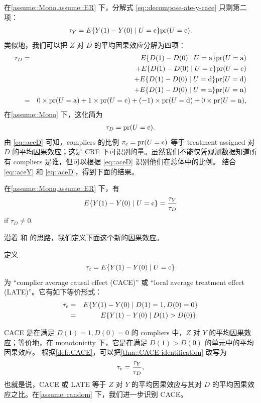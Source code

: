 在\cref{assume::Mono,assume::ER} 下，分解式 \cref{eq::decompose-ate-y-cace} 只剩第二项：
\begin{eqnarray}
\label{eq::aceY}
\tau_Y  = E\{ Y(1) - Y(0) \mid U=\textup{c}   \} \textup{pr}(U = \textup{c} ).
\end{eqnarray}
类似地，我们可以把 $Z$ 对 $D$ 的平均因果效应分解为四项：
\begin{eqnarray*}
\tau_D &=& E\{ D(1) - D(0) \mid U=\textup{a}  \} \textup{pr}(U = \textup{a} ) \\
&&+ E\{ D(1) - D(0) \mid U=\textup{c}   \} \textup{pr}(U = \textup{c} ) \\
&&+ E\{ D(1) - D(0) \mid U=\textup{d}  \} \textup{pr}(U = \textup{d} ) \\
&&+ E\{ D(1) - D(0) \mid U=\textup{n}  \} \textup{pr}(U = \textup{n} )  \\
&=& 0\times \textup{pr}(U = \textup{a} ) 
+ 1 \times \textup{pr}(U = \textup{c} ) 
+ (-1)\times   \textup{pr}(U = \textup{d} )
+ 0 \times  \textup{pr}(U = \textup{n} ) ,
\end{eqnarray*}
在\cref{assume::Mono} 下，这化简为
\begin{eqnarray}
\label{eq::aceD}
\tau_D  = \textup{pr}(U = \textup{c} ) .
\end{eqnarray}
由 \cref{eq::aceD} 可知，compliers 的比例 $\pi_{\textup{c}} = \textup{pr}(U = \textup{c})$ 等于 treatment assigned 对 $D$ 的平均因果效应；这是 CRE 下可识别的量。虽然我们不能仅凭观测数据知道所有 compliers 是谁，但可以根据 \cref{eq::aceD} 识别他们在总体中的比例。
结合 \cref{eq::aceY} 和 \cref{eq::aceD}，得到下面的结果。


\begin{theorem}
\label{thm::CACE-identification}
在\cref{assume::Mono,assume::ER} 下，有
$$
E\{ Y(1) - Y(0) \mid U=\textup{c}   \} = \frac{ \tau_Y  }{ \tau_D}
$$
if $\tau_D \neq 0$. 
\end{theorem}


 

沿着 \citet{imbens1994identification} 和 \citet{angrist1996identification} 的思路，我们定义下面这个新的因果效应。

\begin{definition}\label{def::CACE}
定义
$$
\tau_{\textup{c}}  =  E\{ Y(1) - Y(0) \mid U=\textup{c}   \}  
$$
为 ``complier average causal effect (CACE)'' 或 ``local average treatment effect (LATE)''。它有如下等价形式：
\begin{eqnarray*}
\tau_{\textup{c}}  &=&  E\{ Y(1) - Y(0) \mid D(1) = 1 , D(0) = 0  \} \\
&=&    E\{ Y(1) - Y(0) \mid D(1)  >  D(0)    \} . 
\end{eqnarray*}
\end{definition}

CACE 是在满足 $ D(1) = 1 , D(0) = 0$ 的 compliers 中，$Z$ 对 $Y$ 的平均因果效应；等价地，在 monotonicity 下，它是在满足 $ D(1)  >  D(0)$ 的单元中的平均因果效应。
根据\cref{def::CACE}，可以把\cref{thm::CACE-identification} 改写为
$$
\tau_{\textup{c}}  = \frac{ \tau_Y  }{ \tau_D} ,
$$
也就是说，CACE 或 LATE 等于 $Z$ 对 $Y$ 的平均因果效应与其对 $D$ 的平均因果效应之比。在\cref{assume::random} 下，我们进一步识别 CACE。



